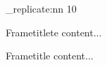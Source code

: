 \documentclass[aspectratio=169,t]{beamer}
\begin{document}
\ExplSyntaxOn

\prg_replicate:nn {10} {%
\begin{frame}{Frametitle}te
content...


\end{frame}
}

\ExplSyntaxOff


\begin{frame}{Frametitle}
content...

\end{frame}
\end{document}
